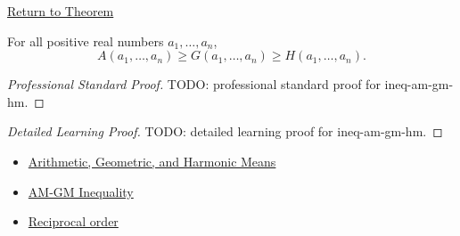 \newpage
{}
\label{prf:ineq-am-gm-hm}

\begin{remark*}[Return]
\hyperref[thm:ineq-am-gm-hm]{Return to Theorem}
\end{remark*}

\begin{theorem*}[AM-GM-HM Inequality]
For all positive real numbers $a_1,\dots,a_n$,
\[
A(a_1,\dots,a_n)\ge G(a_1,\dots,a_n)\ge H(a_1,\dots,a_n).
\]
\end{theorem*}

\begin{proof}[Professional Standard Proof]
\LRAProofBodyStart
TODO: professional standard proof for ineq-am-gm-hm.
\end{proof}

\begin{proof}[Detailed Learning Proof]
\LRAProofBodyStart
TODO: detailed learning proof for ineq-am-gm-hm.
\end{proof}

\begin{remark*}
\end{remark*}

\begin{dependencies}
\begin{itemize}
  \item \hyperref[def:classical-means]{Arithmetic, Geometric, and Harmonic Means}
  \item \hyperref[thm:ineq-am-gm]{AM-GM Inequality}
  \item \hyperref[thm:ineq-reciprocal-positive]{Reciprocal order}
\end{itemize}
\end{dependencies}

\clearpage

